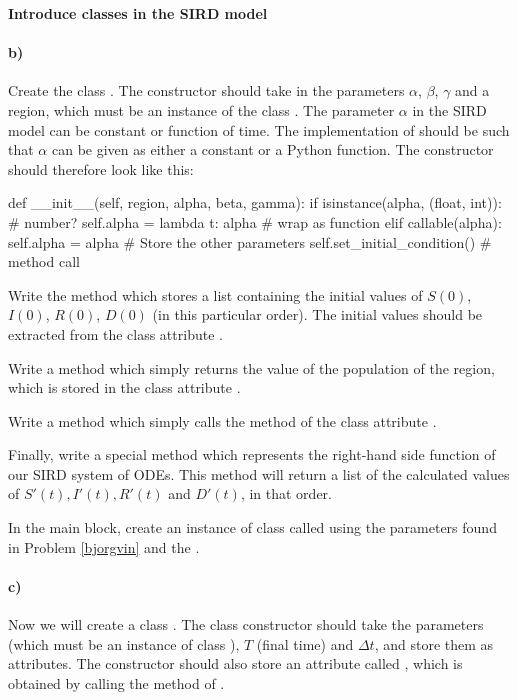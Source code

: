 \begin{Problem}{\textbf{Introduce classes in the SIRD model}}
\paragraph{b)}
 Create the class .  The constructor should take in the parameters $\alpha$, $\beta$, $\gamma$ and a region, which must be an instance of the class . The parameter $\alpha$ in the SIRD model can be constant or function of time. The implementation of  should be such that $\alpha$ can be given as either a constant or a Python function. The constructor should therefore look like this:
\begin{python}
def __init__(self, region, alpha, beta, gamma):
    if isinstance(alpha, (float, int)): # number?
        self.alpha = lambda t: alpha    # wrap as function
    elif callable(alpha):
        self.alpha = alpha
    # Store the other parameters
    self.set_initial_condition()        # method call
\end{python}

Write the method  which stores a list \newline {} containing the initial values of $S(0)$, $I(0)$, $R(0)$, $D(0)$ (in this particular order). The initial values should be extracted from the class attribute .

Write a method  which simply returns the value of the population of the region, which is stored in the class attribute .

Write a method  which simply calls the method  of the class attribute .

Finally, write a special method  which represents the right-hand side function of our SIRD system  of ODEs. This method will return a list of the calculated values of $S'(t), I'(t), R'(t)$ and $D'(t)$, in that order.


In the main block, create an instance of class  called  using the parameters found in Problem \ref{bjorgvin} and the .

\paragraph{c)}
Now we will create a class . The class constructor should take the parameters  (which must be an instance of class ), $T$ (final time) and $\Delta t$, and store them as attributes. The constructor should also store  an attribute called , which is obtained by calling the  method of .


\end{Problem}
